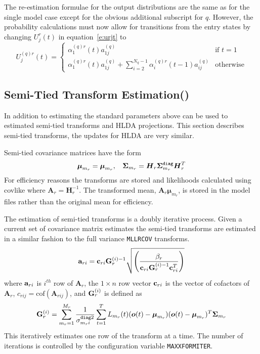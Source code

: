 The re-estimation formulae for the output distributions are the
same as for the single model case except 
for the obvious additional subscript for $q$.  However, the
probability calculations must now allow for transitions from the
entry states by changing $U^r_j(t)$ in equation~\ref{e:urjt} to
\[
  U^{(q)r}_j(t) = \left\{ \begin{array}{cl}
                              \alpha^{(q)r}_1(t) a^{(q)}_{1j}   & \mbox{if $t=1$} \\
                   \alpha^{(q)r}_1(t) a^{(q)}_{1j} + 
                   \sum^{N_q-1}_{i=2} \alpha^{(q)r}_i(t-1) 
                       a^{(q)}_{ij}         & \mbox{otherwise}
                \end{array}
        \right.
\]

\subsection{Semi-Tied Transform Estimation()}
In addition to estimating the standard parameters above 
can be used to estimated semi-tied transforms and HLDA projections.
This section describes semi-tied transforms,  the updates for HLDA
are very similar. 

Semi-tied covariance matrices have the form
\begin{eqnarray}
{{\mbox{\boldmath $\mu$}}}_{m_r} = {\mbox{\boldmath $\mu$}}_{m_r}, \:\:\:\: 
{{\mbox{\boldmath $\Sigma$}}}_{m_r} = {{\mbox{\boldmath $H$}}}_r{{\mbox{\boldmath $\Sigma$}}}^{\tt diag}_{m_r}{{\mbox{\boldmath $H$}}}_r^T
\end{eqnarray}
For efficiency reasons the transforms are stored and likelihoods
calculated using
 {covlike}
where $\bm{A}_r=\bm{H}_r^{-1}$. The transformed mean, $\bm{A}_{r}\bm{\mu}_{m_r}$, is stored
in the model files rather than the original mean for efficiency.

The estimation of semi-tied transforms is a doubly iterative process. 
Given a current set of covariance matrix estimates the semi-tied 
transforms are estimated in a similar fashion to the full variance
{\tt MLLRCOV} transforms.
\begin{eqnarray}
{\bf a}_{ri} ={\bf c}_{ri}{\bf G}^{(i)-1}_r
\sqrt{\left(\frac{\beta_r}{{\bf
c}_{ri}{\bf G}_r^{(i)-1}{\bf c}^T_{ri}}\right)}
\end{eqnarray}
where ${\bf a}_{ri}$ is $i^{th}$ row of ${\bm
A}_r$, the $1\times n$ row vector ${\bf c}_{ri}$ is the vector of
cofactors of ${\bm A}_r$, $c_{rij}={\mbox{cof}}({\bm A}_{rij})$,
and  ${\bf G}^{(i)}_r$ is defined as
\begin{eqnarray}
{\bf G}^{(i)}_r=\sum_{m_r=1}^{M_r}
\frac{1}{\sigma_{m_ri}^{{\tt diag}2}}
\sum_{t=1}^TL_{m_r}(t)({\mbox{\boldmath $o$}}(t)-{{\mbox{\boldmath $\mu$}}}_{m_r})
({\mbox{\boldmath $o$}}(t)-{{\mbox{\boldmath $\mu$}}}_{m_r})^T
{{\mbox{\boldmath $\Sigma$}}}_{m_r}
\label{eq:gi_st}
\end{eqnarray}
This iteratively estimates one row of the transform at a time.  The number of 
iterations is controlled by the  configuration 
variable {\tt MAXXFORMITER}.

